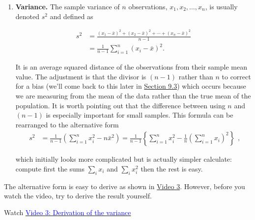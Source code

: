 \documentclass[
]{book}
\providecommand{\tightlist}{%
  \setlength{\itemsep}{0pt}\setlength{\parskip}{0pt}}
\begin{document}
\begin{enumerate}
\def\labelenumi{\arabic{enumi}.}
\tightlist
\item
  {\textbf{Variance.}} The sample variance of \(n\) observations,
  \(x_1 , x_2 , \ldots, x_n\), is usually denoted \(s^2\) and defined as

  \begin{equation}
  \begin{aligned}
  s^2 &= \frac{(x_1 - {\bar{x}})^2 + (x_2 - {\bar{x}})^2 + \cdots + (x_n - {\bar{x}})^2}{n-1}\\
  &= \frac{1}{n-1} \sum\limits_{i=1}^{n} (x_i - {\bar{x}})^2.\end{aligned}
    \label{eq:samplevariance}
    \end{equation}

  It is an average squared distance of the observations from their
  sample mean value. The adjustment is that the divisor is \((n-1)\)
  rather than \(n\) to correct for a bias (we'll come back to this later in
  \protect\hyperlink{paraestimate_judge}{Section 9.3}) which occurs
  because we are measuring from the mean of the data rather than the
  true mean of the population. It is worth pointing out that the
  difference between using \(n\) and \((n-1)\) is especially important for
  small samples.
  This formula can be
  rearranged to the alternative form\\

  \begin{equation}
    \begin{aligned}
    s^2 &= \frac{1}{n-1} \left( \sum\limits_{i=1}^{n} x_i^2 - n {\bar{x}} ^2 \right) = \frac{1}{n-1}  \left\{  \sum_{i=1}^n x_i^2 - \frac{1}{n}\left(\sum_{i=1}^n x_i\right)^2 \right\}\end{aligned},
    \end{equation}

  which initially looks more complicated but is actually simpler calculate:
  compute first the sums \(\sum_i x_i\) and \(\sum_i x_i^2\) then the rest is easy.
\end{enumerate}

The alternative form is easy to derive as shown in \protect\hyperlink{video3}{Video 3}. However, before you watch the video, try to derive the result yourself.

Watch \href{https://mediaspace.nottingham.ac.uk/media/Sample+Variance+FINAL+VERSION/1_scrvhrs2}{\textcolor{blue}{Video 3: Derivation of the variance}}
\end{document}
